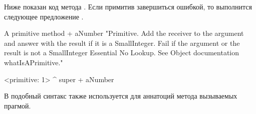 \documentclass[a4paper,10pt,twoside]{book}
\begin{document}
Ниже показан код метода .
Если примитив завершиться ошибкой, то выполнится следующее предложение .

\begin{method}[primitive]{A primitive method}
+ aNumber 
  "Primitive. Add the receiver to the argument and answer with the result
  if it is a SmallInteger. Fail if the argument or the result is not a
  SmallInteger  Essential  No Lookup. See Object documentation whatIsAPrimitive."

  <primitive: 1>
  ^ super + aNumber
\end{method}






В \pharo подобный синтакс также используется для аннатоций метода вызываемых прагмой.

\end{document}
